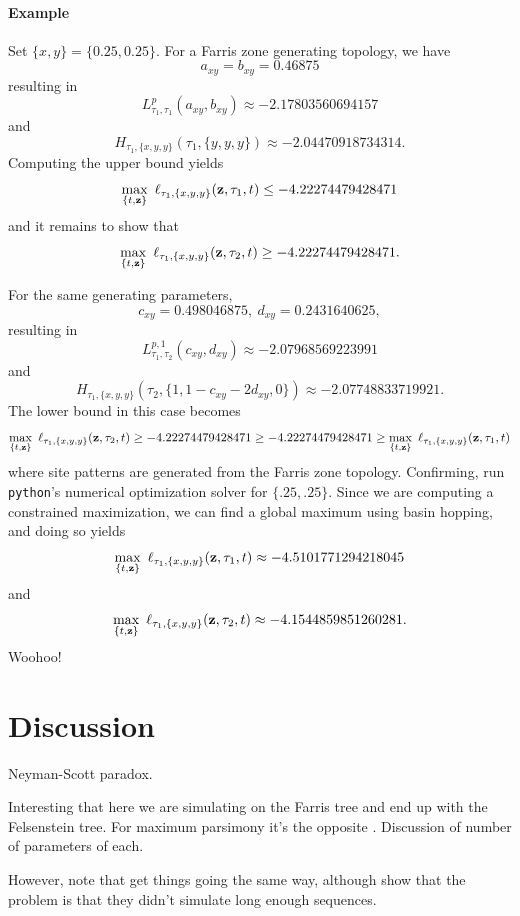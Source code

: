 \documentclass[a4paper]{article}
\begin{document}
\paragraph{Example}

Set $\{x, y\} = \{0.25, 0.25\}$.
For a Farris zone generating topology, we have
$$
a_{xy} = b_{xy} = 0.46875
$$
resulting in
$$
L^{p}_{\tau_1,\tau_1}(a_{xy},b_{xy}) \approx -2.17803560694157
$$
and
$$
H_{\tau_1,\{x,y,y\}}(\tau_1,\{y, y, y\})  \approx -2.04470918734314.
$$
Computing the upper bound yields
$$
\max_{\{t,\fullAncestralStateCategories\}} \ \ell_{\tau_1,\{x,y,y\}}(\fullAncestralStateCategories,\tau_1,t) \le -4.22274479428471
$$
and it remains to show that
$$
\max_{\{t,\fullAncestralStateCategories\}} \ \ell_{\tau_1,\{x,y,y\}}(\fullAncestralStateCategories,\tau_2,t) \ge -4.22274479428471.
$$

For the same generating parameters,
$$
c_{xy} = 0.498046875, \ d_{xy} = 0.2431640625,
$$
resulting in
$$
L^{p,1}_{\tau_1,\tau_2}(c_{xy},d_{xy}) \approx -2.07968569223991
$$
and
$$
H_{\tau_1,\{x,y,y\}}(\tau_2,\{1, 1-c_{xy}-2d_{xy}, 0\}) \approx -2.07748833719921.
$$
The lower bound in this case becomes
$$
\max_{\{t,\fullAncestralStateCategories\}} \ \ell_{\tau_1,\{x,y,y\}}(\fullAncestralStateCategories,\tau_2,t) \ge -4.22274479428471 \ge -4.22274479428471 \ge \max_{\{t,\fullAncestralStateCategories\}} \ \ell_{\tau_1,\{x,y,y\}}(\fullAncestralStateCategories,\tau_1,t)
$$
where site patterns are generated from the Farris zone topology.
Confirming, run \texttt{python}'s numerical optimization solver for $\{.25, .25\}$.
Since we are computing a constrained maximization, we can find a global maximum using basin hopping, and doing so yields
$$
\max_{\{t,\fullAncestralStateCategories\}} \ \ell_{\tau_1,\{x,y,y\}}(\fullAncestralStateCategories,\tau_1,t) \approx -4.5101771294218045
$$
and
$$
\max_{\{t,\fullAncestralStateCategories\}} \ \ell_{\tau_1,\{x,y,y\}}(\fullAncestralStateCategories,\tau_2,t) \approx -4.1544859851260281.
$$
Woohoo!

\section{Discussion}

Neyman-Scott paradox.

Interesting that here we are simulating on the Farris tree and end up with the Felsenstein tree.
For maximum parsimony it's the opposite \cite{Felsenstein1978-rr}.
Discussion of number of parameters of each.

However, note that \cite{Siddall1998-hq} get things going the same way, although \cite{Swofford2001-hr} show that the problem is that they didn't simulate long enough sequences.



\end{document}

